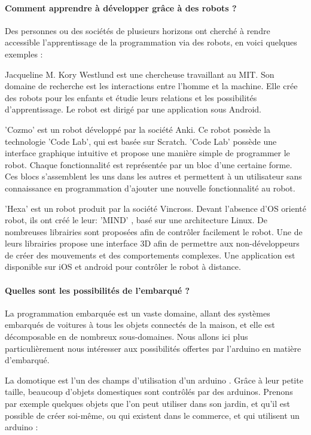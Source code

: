 \documentclass[12pt,francais]{report}
\begin{document}
\paragraph*{Comment apprendre à développer grâce à des robots ?\\}

Des personnes ou des sociétés de plusieurs horizons ont cherché à rendre accessible l'apprentissage de la programmation via des robots, en voici quelques exemples :

Jacqueline M. Kory Westlund est une chercheuse travaillant au MIT. Son domaine de recherche est les interactions entre l'homme et la machine.
Elle crée des robots pour les enfants et étudie leurs relations et les possibilités d'apprentissage.\cite{ref9}
Le robot est dirigé par une application sous Android.

'Cozmo' est un robot développé par la société Anki. Ce robot possède la technologie 'Code Lab', qui est basée sur Scratch.\cite{ref10} 
'Code Lab' possède une interface graphique intuitive et propose une manière simple de programmer le robot.
Chaque fonctionnalité est représentée par un bloc d'une certaine forme.
Ces blocs s'assemblent les uns dans les autres et permettent à un utilisateur sans connaissance en programmation d'ajouter une nouvelle fonctionnalité au robot.

'Hexa' est un robot produit par la société Vincross. Devant l'absence d'OS orienté robot, ils ont créé le leur: 'MIND' \cite{ref11},
basé sur une architecture Linux. De nombreuses librairies sont proposées afin de contrôler facilement le robot.
Une de leurs librairies propose une interface 3D afin de permettre aux non-développeurs de créer des mouvements et des comportements complexes.
Une application est disponible sur iOS et android pour contrôler le robot à distance.

\paragraph*{Quelles sont les possibilités de l'embarqué ?\\}

La programmation embarquée est un vaste domaine, allant des systèmes embarqués de voitures à tous les objets connectés de la maison, et elle est décomposable en de nombreux sous-domaines. Nous allons ici plus particulièrement nous intéresser aux possibilités offertes par l'arduino en matière d'embarqué.

La domotique est l'un des champs d'utilisation d'un arduino \cite{ref20}. Grâce à leur petite taille, beaucoup d'objets domestiques sont contrôlés par des arduinos. Prenons par exemple quelques objets que l'on peut utiliser dans son jardin, et qu'il est possible de créer soi-même, ou qui existent dans le commerce, et qui utilisent un arduino \cite{ref21}: 
\end{document}
